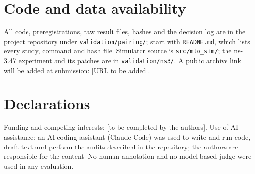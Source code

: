 \documentclass[11pt]{article}
\theoremstyle{definition}
\begin{document}
\section*{Code and data availability}
All code, preregistrations, raw result files, hashes and the decision log are in the project repository under \texttt{validation/pairing/}; start with \texttt{README.md}, which lists every study, command and hash file. Simulator source is \texttt{src/mlo\_sim/}; the ns-3.47 experiment and its patches are in \texttt{validation/ns3/}. A public archive link will be added at submission: [URL to be added].

\section*{Declarations}
Funding and competing interests: [to be completed by the authors]. Use of AI assistance: an AI coding assistant (Claude Code) was used to write and run code, draft text and perform the audits described in the repository; the authors are responsible for the content. No human annotation and no model-based judge were used in any evaluation.



\end{document}
